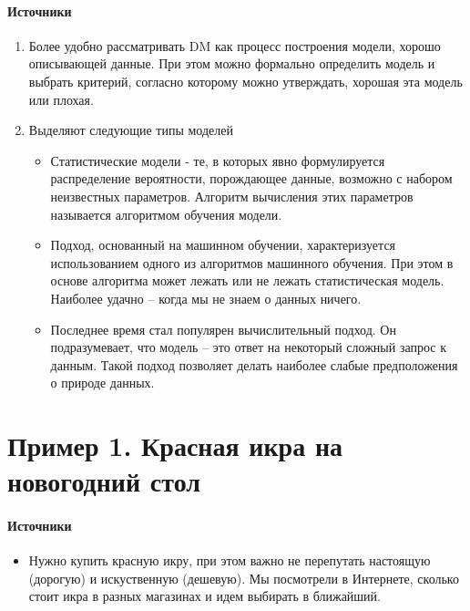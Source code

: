 \documentclass[10pt,a4paper]{article}
\begin{document}
\paragraph{Источники} \cite{mmds}

\begin{enumerate}
\item Более удобно рассматривать DM как процесс построения модели, хорошо описывающей данные. При этом можно формально определить модель и выбрать критерий, согласно которому можно утверждать, хорошая эта модель или плохая.
\item Выделяют следующие типы моделей
\begin{itemize}
\item Статистические модели - те, в которых явно формулируется распределение вероятности, порождающее данные, возможно с набором неизвестных параметров. Алгоритм вычисления этих параметров называется алгоритмом обучения модели.
\item Подход, основанный на машинном обучении, характеризуется использованием одного из алгоритмов машинного обучения. При этом в основе алгоритма может лежать или не лежать статистическая модель. Наиболее удачно -- когда мы не знаем о данных ничего.
\item Последнее время стал популярен вычислительный подход. Он подразумевает, что модель -- это ответ на некоторый сложный запрос к данным. Такой подход позволяет делать наиболее слабые предположения о природе данных.
\end{itemize}
\end{enumerate}


\section{Пример 1. Красная икра на новогодний стол}

\paragraph{Источники} \cite[ch. 2.3.4]{bishop}

\begin{itemize}
\item Нужно купить красную икру, при этом важно не перепутать настоящую (дорогую) и искуственную (дешевую). Мы посмотрели в Интернете, сколько стоит икра в разных магазинах и идем выбирать в ближайший.
\end{itemize}
\end{document}
